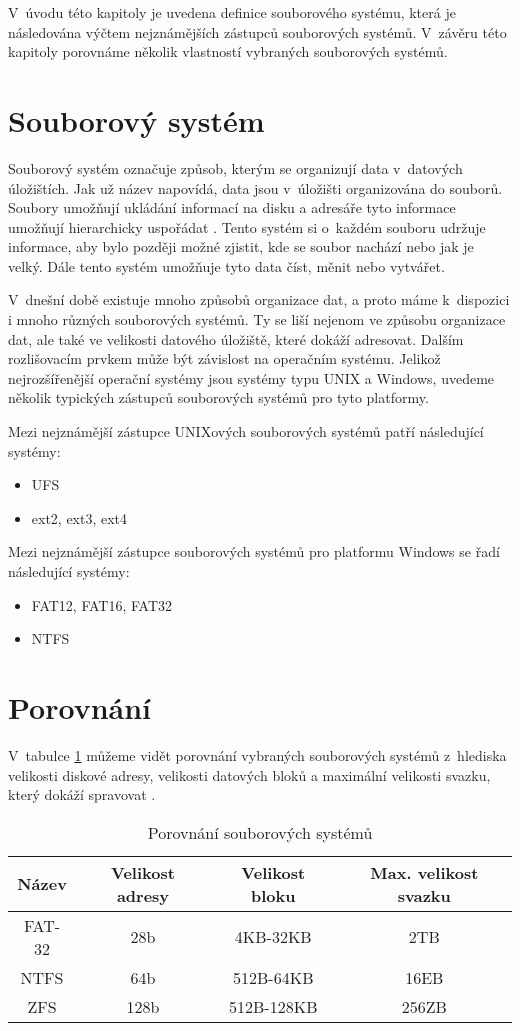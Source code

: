 V~úvodu této kapitoly je uvedena definice souborového systému, která je následována výčtem nejznámějších zástupců souborových systémů. V~závěru této kapitoly porovnáme několik vlastností vybraných souborových systémů.
\section{Souborový systém}
    \label{fs}
    Souborový systém označuje způsob, kterým se organizují data v~datových úložištích. Jak už název napovídá, data jsou v~úložišti organizována do souborů. Soubory umožňují ukládání informací na disku a adresáře tyto informace umožňují hierarchicky uspořádat \cite{fs}. Tento systém si o~každém souboru udržuje informace, aby bylo později možné zjistit, kde se soubor nachází nebo jak je velký. Dále tento systém umožňuje tyto data číst, měnit nebo vytvářet.

    V~dnešní době existuje mnoho způsobů organizace dat, a proto máme k~dispozici i mnoho různých souborových systémů. Ty se liší nejenom ve způsobu organizace dat,
    ale také ve velikosti datového úložiště, které dokáží adresovat. Dalším rozlišovacím prvkem může být závislost na operačním systému.
    Jelikož nejrozšířenější operační systémy jsou systémy typu UNIX a Windows, uvedeme několik typických zástupců souborových systémů pro tyto platformy.

    Mezi nejznámější zástupce UNIXových souborových systémů patří následující systémy:
    \begin{itemize}
      \item UFS
      \item ext2, ext3, ext4
    \end{itemize}

    Mezi nejznámější zástupce souborových systémů pro platformu Windows se řadí následující systémy:
    \begin{itemize}
      \item FAT12, FAT16, FAT32
      \item NTFS
    \end{itemize}

\section{Porovnání}
    V~tabulce \ref{fscompare} můžeme vidět porovnání vybraných souborových systémů z~hlediska velikosti diskové adresy, velikosti datových bloků a maximální velikosti svazku, který dokáží spravovat \cite{fs}.
    \begin{table}
    \centering
    \caption{Porovnání souborových systémů}
    \label{fscompare}
    \begin{tabular}{|c|c|c|c|}
    \hline
    Název & Velikost adresy & Velikost bloku & Max. velikost svazku \\ \hline
    FAT-32 & 28b & 4KB-32KB & 2TB \\ \hline
    NTFS & 64b & 512B-64KB & 16EB \\ \hline
    ZFS & 128b & 512B-128KB & 256ZB \\ \hline
    \end{tabular}
    \end{table} 